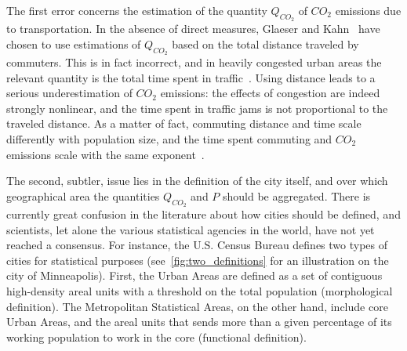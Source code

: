 The first error concerns the estimation of the quantity $Q_{CO_2}$ of $CO_2$ emissions due to
transportation. In the absence of direct measures, Glaeser and Kahn~\cite{Glaeser:2010} have chosen
to use estimations of $Q_{CO_2}$ based on the total distance traveled by commuters. This is in fact
incorrect, and in heavily congested urban areas the relevant quantity is the total time spent
in traffic~\cite{Louf:2013}. Using distance leads to a serious underestimation of
$CO_2$ emissions: the effects of congestion are indeed strongly nonlinear, and the time spent
in traffic jams is not proportional to the traveled distance. As a matter of fact, commuting
distance and time scale differently with population size, and the time spent commuting and
$CO_2$ emissions scale with the same exponent~\cite{Louf:2014}.

The second, subtler, issue lies in the definition of the city itself, and over
which geographical area the quantities $Q_{CO_2}$ and $P$ should be aggregated.
There is currently great confusion in the literature about how cities should be
defined, and scientists, let alone the various statistical agencies in the
world, have not yet reached a consensus. For instance, the U.S. Census Bureau
defines two types of cities for statistical purposes
(see~\ref{fig:two_definitions} for an illustration on the city of Minneapolis).
First, the Urban Areas are defined as a set of contiguous high-density areal
units with a threshold on the total population (morphological definition). The Metropolitan Statistical
Areas, on the other hand, include core Urban Areas, and the areal units that
sends more than a given percentage of its working population to work in the
core (functional definition).

